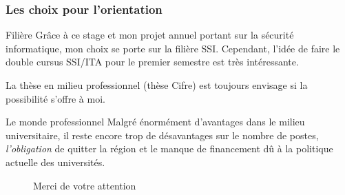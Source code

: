 \documentclass{beamer}
\begin{document}
  \begin{frame}
    \frametitle{Les choix pour l'orientation}

    \begin{block}{Filière}  
      Grâce à ce stage et mon projet annuel portant sur la sécurité informatique, mon choix se porte sur la filière SSI. Cependant, l’idée de faire le double cursus SSI/ITA pour le premier semestre est très intéressante. 

      La thèse en milieu professionnel (thèse Cifre) est toujours envisage si la possibilité s'offre à moi.
    \end{block}
    \pause
    \begin{block}{Le monde professionnel}  
      Malgré énormément d'avantages dans le milieu universitaire, il reste encore trop de désavantages sur le nombre de postes, \textit{l'obligation} de quitter la région et le manque de financement dû à la politique actuelle des universités.
    \end{block}
  \end{frame}

  \begin{frame}
    \begin{figure}
      \centering
      Merci de votre attention
    \end{figure}
  \end{frame}
  
\end{document}
